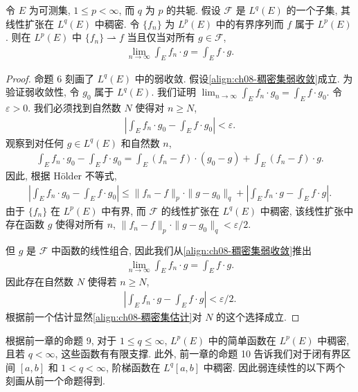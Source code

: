 \documentclass[../../main.tex]{subfiles}
\begin{document}
\begin{proposition}\label{proposition:ch08-稠密集弱收敛}
令 $E$ 为可测集, $1\leqslant p<\infty$, 而 $q$ 为 $p$ 的共轭. 假设 $\mathcal{F}$ 是 $L^{q}(E)$ 的一个子集, 其线性扩张在 $L^{q}(E)$ 中稠密. 令 $\{f_{n}\}$ 为 $L^{p}(E)$ 中的有界序列而 $f$ 属于 $L^{p}(E)$. 则在 $L^{p}(E)$ 中 $\{f_{n}\}\rightharpoonup f$ 当且仅当对所有 $g\in\mathcal{F}$,
\begin{align}
\lim_{n\to\infty}\int_{E}f_{n}\cdot g=\int_{E}f\cdot g.\label{align:ch08-稠密集弱收敛}
\end{align}
\end{proposition}

\begin{proof}
命题 6 刻画了 $L^{q}(E)$ 中的弱收敛. 假设\eqref{align:ch08-稠密集弱收敛}成立. 为验证弱收敛性, 令 $g_{0}$ 属于 $L^{q}(E)$. 我们证明 $\lim_{n\to\infty}\int_{E}f_{n}\cdot g_{0}=\int_{E}f\cdot g_{0}$. 令 $\varepsilon>0$. 我们必须找到自然数 $N$ 使得对 $n\geqslant N$,
\begin{align}
\left|\int_{E}f_{n}\cdot g_{0}-\int_{E}f\cdot g_{0}\right|<\varepsilon.\label{align:ch08-稠密集估计}
\end{align}
观察到对任何 $g\in L^{q}(E)$ 和自然数 $n$,
\begin{align*}
\int_{E}f_{n}\cdot g_{0}-\int_{E}f\cdot g_{0}=\int_{E}(f_{n}-f)\cdot(g_{0}-g)+\int_{E}(f_{n}-f)\cdot g.
\end{align*}
因此, 根据 H\"older 不等式,
\begin{align*}
\left|\int_{E}f_{n}\cdot g_{0}-\int_{E}f\cdot g_{0}\right|\leqslant\|f_{n}-f\|_{p}\cdot\|g-g_{0}\|_{q}+\left|\int_{E}f_{n}\cdot g-\int_{E}f\cdot g\right|.
\end{align*}
由于 $\{f_{n}\}$ 在 $L^{p}(E)$ 中有界, 而 $\mathcal{F}$ 的线性扩张在 $L^{q}(E)$ 中稠密, 该线性扩张中存在函数 $g$ 使得对所有 $n$, $\|f_{n}-f\|_{p}\cdot\|g-g_{0}\|_{q}<\varepsilon/2$.

但 $g$ 是 $\mathcal{F}$ 中函数的线性组合, 因此我们从\eqref{align:ch08-稠密集弱收敛}推出
\begin{align*}
\lim_{n\to\infty}\int_{E}f_{n}\cdot g=\int_{E}f\cdot g.
\end{align*}
因此存在自然数 $N$ 使得若 $n\geqslant N$,
\begin{align*}
\left|\int_{E}f_{n}\cdot g-\int_{E}f\cdot g\right|<\varepsilon/2.
\end{align*}
根据前一个估计显然\eqref{align:ch08-稠密集估计}对 $N$ 的这个选择成立.
\end{proof}

根据前一章的命题 9, 对于 $1\leqslant q\leqslant\infty$, $L^{p}(E)$ 中的简单函数在 $L^{p}(E)$ 中稠密, 且若 $q<\infty$, 这些函数有有限支撑. 此外, 前一章的命题 10 告诉我们对于闭有界区间 $[a,b]$ 和 $1<q<\infty$, 阶梯函数在 $L^{q}[a,b]$ 中稠密. 因此弱连续性的以下两个刻画从前一个命题得到.
\end{document}
